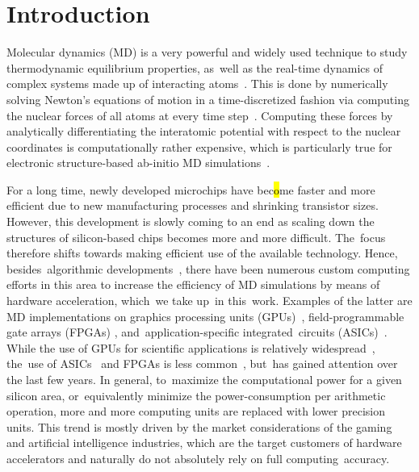 \documentclass[computation,article,accept,moreauthors,pdftex]{Definitions/mdpi}
\newcommand{\review}[1]{{\color{BrickRed}#1}}
\begin{document}

\section{Introduction}

Molecular dynamics (MD) is a very powerful and widely used technique to study thermodynamic equilibrium properties, as~well as the real-time dynamics of complex systems made up of interacting atoms~\cite{AlderWainwright1957}. This is done by numerically solving Newton's equations of motion in a time-discretized fashion via computing the nuclear forces of all atoms at every time step~\cite{RahmanMD}. Computing these forces by analytically differentiating the interatomic potential with respect to the nuclear coordinates is computationally rather expensive, which is particularly true for electronic structure-based {ab-initio} MD simulations~\cite{CPMD, CPMD_TDK, PayneRMP, WIRES_TDK}.

For a long time, newly developed microchips have bec\hl{o}me faster and more efficient due to new manufacturing processes and shrinking transistor sizes. However, this development is slowly coming to an end as scaling down the structures of silicon-based chips becomes more and more difficult. The~focus therefore shifts towards making efficient use of the available technology. Hence, besides~algorithmic developments~\cite{MTS, Snir, GSE, Shaw, VerletCell, pSHAKE, John, Prodan}, there have been numerous custom computing efforts in this area to increase the efficiency of MD simulations by means of hardware acceleration, which~we take up~in this~work. Examples of the latter are MD implementations on graphics processing units (GPUs)~\cite{HOOMD, NAMD, OpenMM, HalMD, Lammps, Amber, Gromacs}, field-programmable gate arrays (FPGAs) \cite{HerbordtI, HerbordtII}, and~application-specific integrated~circuits (ASICs)~\cite{AntonI, AntonII}.
While the use of GPUs for scientific applications is relatively widespread~\cite{GPUcomp,Binder,Weigel}, the~use of ASICs~\cite{QCDScience, QCDOC, GrapeScience, Grape} and FPGAs is less common~\cite{JanusI, JanusII, Convey, FDTD, Kenter, Galerkin}, but~has gained attention over the last few years.
In general, to~maximize the computational power for a given silicon area, or~equivalently minimize the power-consumption per arithmetic operation, more and more computing units are replaced with lower precision units. This trend is mostly driven by the market considerations of the gaming and artificial intelligence industries, which are the target customers of hardware accelerators and naturally do not absolutely rely on full computing~accuracy.
\end{document}
